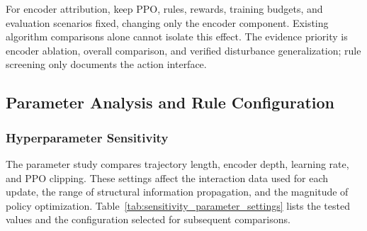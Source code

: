 
For encoder attribution, keep PPO, rules, rewards, training budgets, and evaluation scenarios fixed,
changing only the encoder component. Existing algorithm comparisons alone cannot isolate this effect.
The evidence priority is encoder ablation, overall comparison, and verified disturbance generalization;
rule screening only documents the action interface.

\subsection{Parameter Analysis and Rule Configuration}
\label{subsec:sensitivity}

\subsubsection{Hyperparameter Sensitivity}

The parameter study compares trajectory length, encoder depth, learning rate, and PPO clipping.
These settings affect the interaction data used for each update, the range of structural information propagation,
and the magnitude of policy optimization. Table~\ref{tab:sensitivity_parameter_settings} lists the tested values
and the configuration selected for subsequent comparisons.


